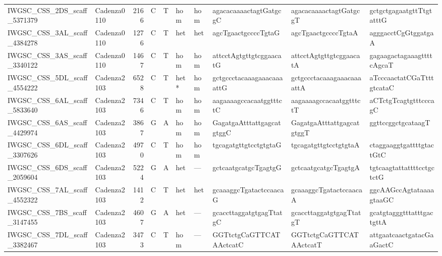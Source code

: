 \begin{longtable}{llrlllllll}
 IWGSC\_CSS\_2DS\_scaff\_5371379  & Cadenza0110 &       2166 & C         & T        & hom            & hom         & agacacaaaactagtGatgcgC    & agacacaaaactagtGatgcgT    & gctgctgagaatgttTtgtatttG  \\
 IWGSC\_CSS\_3AL\_scaff\_4384278  & Cadenza0110 &       1276 & C         & T        & het            & het         & agcTgaactgccccTgtaG       & agcTgaactgccccTgtaA       & agggacctCgGtggatgaA       \\
 IWGSC\_CSS\_3AS\_scaff\_3340122  & Cadenza0110 &       1467 & C         & T        & hom            & hom         & attcctAgtgttgtcggaacatG   & attcctAgtgttgtcggaacatA   & gagaagactagaaagttttcAgcaT \\
 IWGSC\_CSS\_5DL\_scaff\_4554222  & Cadenza2103 &       6528 & C         & T        & het*           & hom         & gctgccctacaaagaaacaaaattG & gctgccctacaaagaaacaaaattA & aTcccaactatCGaTtttgtcataC \\
 IWGSC\_CSS\_6AL\_scaff\_5833640  & Cadenza2103 &       7346 & C         & T        & hom            & hom         & aagaaaagccacaatggtttctC   & aagaaaagccacaatggtttctT   & aCTctgTcagtgtttcccagC     \\
 IWGSC\_CSS\_6AS\_scaff\_4429974  & Cadenza2103 &       3867 & G         & A        & hom            & hom         & GagatgaAtttattgagcatgtggC & GagatgaAtttattgagcatgtggT & ggttccggctgcataagT        \\
 IWGSC\_CSS\_6DL\_scaff\_3307626  & Cadenza2103 &       4970 & C         & T        & hom            & hom         & tgcagatgttgtcctgtgtaG     & tgcagatgttgtcctgtgtaA     & ctaggaaggtgattttgtactGtC  \\
 IWGSC\_CSS\_6DS\_scaff\_2059604  & Cadenza2103 &       5224 & G         & A        & het            & ---         & gctcaatgcatgcTgagtgG      & gctcaatgcatgcTgagtgA      & tgtcaagtattattttcctgctctG \\
 IWGSC\_CSS\_7AL\_scaff\_4552322  & Cadenza2103 &       1412 & C         & T        & het            & het         & gcaaaggcTgatactccaacaG    & gcaaaggcTgatactccaacaA    & ggcAAGccAgtataaaagtaaGC   \\
 IWGSC\_CSS\_7BS\_scaff\_3147455  & Cadenza2103 &       4607 & G         & A        & het            & ---         & gcaccttaggatgtgagTtatgC   & gcaccttaggatgtgagTtatgT   & gcatgtagggtttatttgactgttA \\
 IWGSC\_CSS\_7DL\_scaff\_3382467  & Cadenza2103 &       3473 & C         & T        & hom            & ---         & GGTtctgCaGTTCATAActcatC   & GGTtctgCaGTTCATAActcatT   & attgaatcaactgatacGaaGactC \\

\end{longtable}
